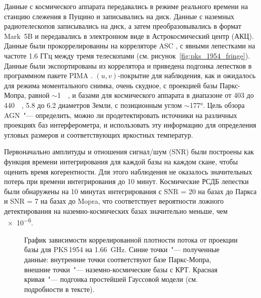 Данные с космического аппарата передавались в режиме реального времени на станцию ​​слежения в
Пущино и записывались на диск. Данные с наземных радиотелескопов записывались на диск, а затем
преобразовывались в формат Mark~5B и передавались в электронном виде в Астрокосмический
центр (АКЦ). Данные были прокоррелированны на корреляторе ASC \cite{Kardashev_2013_rus}, с явными
лепестками на частоте 1.6 ГГц между тремя телескопами (см. рисунок~\ref{fig:pks_1954_fringe}).
Данные были экспортированы из коррелятора и приведена подгонка лепестков в программном пакете PIMA
\cite{Petrov_2011}. $(u, v)$-покрытие для наблюдения, как и ожидалось для режима моментального
снимка, очень скудное, с проекцией базы Паркс-Мопра, равной $\sim$\SI{1}{\mega\la}, и базами для
космического аппарата в диапазоне от 403 до \SI{440}{\mega\la}, 5.8 до 6.2 диаметров Земли, с
позиционным углом $\sim$\ang{177}. Цель обзора AGN~"--- определить, можно ли продетектировать
источники на различных проекциях баз интерферометра, и использовать эту информацию для определения
угловых размеров и соответствующих яркостных температур.

Первоначально амплитуды и отношения сигнал/шум (SNR) были построены как функция времени
интегрирования для каждой базы на каждом скане, чтобы оценить время когерентности.
Для этого наблюдения не оказалось значительных потерь при времени интегрирования до 10 минут.
Космические РСДБ лепестки были обнаружены на 10 минутах интегрирования с SNR = 20 на базах до
Паркса и SNR = 7 на базах до Mopra, что соответствует вероятности ложного детектирования на
наземно-космических базах значительно меньше, чем \num{e-6}.

\begin{figure}[]
\caption{График зависимости коррелированной плотности потока от проекции базы для
PKS\,1954 на \SI{1.66}{\GHz}. Синие точки~"--- полученные данные: внутренние точки
соответствуют базе Паркс-Мопра, внешние точки~"--- наземно-космические базы с КРТ. Красная
кривая~"--- подгонка простейшей Гауссовой модели (см. подробности в тексте).}
\label{fig:pks_1954_radplot}
\end{figure}

